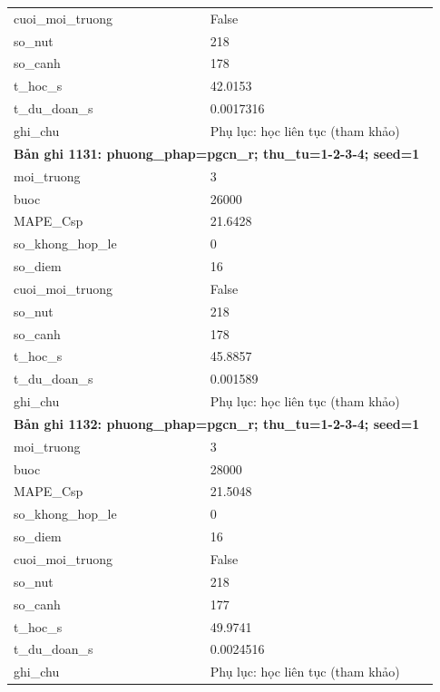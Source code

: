 \begin{longtable}{p{0.43\linewidth}p{0.50\linewidth}}
cuoi\_\allowbreak moi\_\allowbreak truong & False \\
so\_\allowbreak nut & 218 \\
so\_\allowbreak canh & 178 \\
t\_\allowbreak hoc\_\allowbreak s & 42.0153 \\
t\_\allowbreak du\_\allowbreak doan\_\allowbreak s & 0.0017316 \\
ghi\_\allowbreak chu & Phụ lục: học liên tục (tham khảo) \\
\midrule
\multicolumn{2}{p{0.95\linewidth}}{\textbf{Bản ghi 1131: phuong\_phap=pgcn\_r; thu\_tu=1-2-3-4; seed=1}} \\
moi\_\allowbreak truong & 3 \\
buoc & 26000 \\
MAPE\_\allowbreak Csp & 21.6428 \\
so\_\allowbreak khong\_\allowbreak hop\_\allowbreak le & 0 \\
so\_\allowbreak diem & 16 \\
cuoi\_\allowbreak moi\_\allowbreak truong & False \\
so\_\allowbreak nut & 218 \\
so\_\allowbreak canh & 178 \\
t\_\allowbreak hoc\_\allowbreak s & 45.8857 \\
t\_\allowbreak du\_\allowbreak doan\_\allowbreak s & 0.001589 \\
ghi\_\allowbreak chu & Phụ lục: học liên tục (tham khảo) \\
\midrule
\multicolumn{2}{p{0.95\linewidth}}{\textbf{Bản ghi 1132: phuong\_phap=pgcn\_r; thu\_tu=1-2-3-4; seed=1}} \\
moi\_\allowbreak truong & 3 \\
buoc & 28000 \\
MAPE\_\allowbreak Csp & 21.5048 \\
so\_\allowbreak khong\_\allowbreak hop\_\allowbreak le & 0 \\
so\_\allowbreak diem & 16 \\
cuoi\_\allowbreak moi\_\allowbreak truong & False \\
so\_\allowbreak nut & 218 \\
so\_\allowbreak canh & 177 \\
t\_\allowbreak hoc\_\allowbreak s & 49.9741 \\
t\_\allowbreak du\_\allowbreak doan\_\allowbreak s & 0.0024516 \\
ghi\_\allowbreak chu & Phụ lục: học liên tục (tham khảo) \\

\end{longtable}
